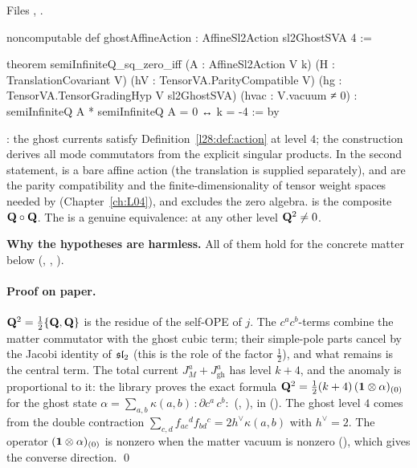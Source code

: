 \noindent Files , .
\begin{leancode}
noncomputable def ghostAffineAction : AffineSl2Action sl2GhostSVA 4 :=

theorem semiInfiniteQ_sq_zero_iff (A : AffineSl2Action V k)
    (H : TranslationCovariant V) (hV : TensorVA.ParityCompatible V)
    (hg : TensorVA.TensorGradingHyp V sl2GhostSVA) (hvac : V.vacuum ≠ 0) :
    semiInfiniteQ A * semiInfiniteQ A = 0 ↔ k = -4 := by
\end{leancode}

\begin{dictionary}
: the ghost currents satisfy Definition~\ref{l28:def:action} at level $4$; the construction
 derives all mode commutators from the explicit singular products. In the second statement,  is a
bare affine action (the translation  is supplied separately),  and  are the parity compatibility and the
finite-dimensionality of tensor weight spaces needed by  (Chapter~\ref{ch:L04}), and  excludes the
zero algebra.  is the composite $\mathbf Q\circ\mathbf Q$. The  is a genuine
equivalence: at any other level $\mathbf Q^2\neq0$.

\textbf{Why the hypotheses are harmless.} All of them hold for the concrete matter below (,
, ).
\end{dictionary}

\paragraph{Proof on paper.} $\mathbf Q^2=\tfrac12\{\mathbf Q,\mathbf Q\}$ is the residue of the self-OPE of $j$. The
$c^ac^b$-terms combine the matter commutator with the ghost cubic term; their simple-pole parts cancel by the Jacobi identity of
$\mathfrak{sl}_2$ (this is the role of the factor $\tfrac12$), and what remains is the central term. The total current
$J^a_M+J^a_{\mathrm{gh}}$ has level $k+4$, and the anomaly is proportional to it: the library proves the exact formula
$\mathbf Q^2=\tfrac12(k+4)\,(\mathbf 1\otimes\alpha)_{(0)}$ for the ghost state $\alpha=\sum_{a,b}\kappa(a,b)\,{:}\partial c^a\,c^b{:}$
(, ), in  (). The ghost level $4$ comes from the double
contraction $\sum_{c,d}f_{ac}{}^df_{bd}{}^c=2h^\vee\kappa(a,b)$ with $h^\vee=2$. The operator $(\mathbf 1\otimes\alpha)_{(0)}$ is nonzero when the matter vacuum is nonzero
(), which gives the converse direction. \qed

